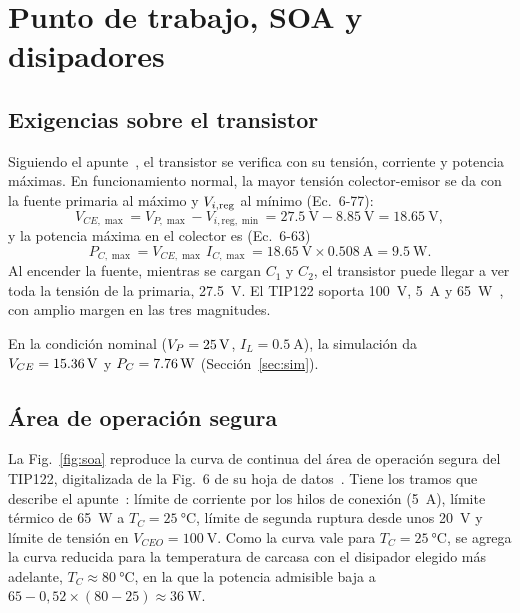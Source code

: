 \section{Punto de trabajo, SOA y disipadores}
\label{sec:soa}

\subsection{Exigencias sobre el transistor}
Siguiendo el apunte~\cite[Sec.~6-8-3]{ap2}, el transistor se verifica con su tensión, corriente y potencia máximas. En funcionamiento normal, la mayor tensión colector-emisor se da con la fuente primaria al máximo y $V_{i,\mathrm{reg}}$ al mínimo (Ec.~6-77):
\begin{equation}
    V_{CE,\max} = V_{P,\max} - V_{i,\mathrm{reg},\min} = \SI{27,5}{\volt} - \SI{8,85}{\volt} = \SI{18,65}{\volt},
\end{equation}
y la potencia máxima en el colector es (Ec.~6-63)
\begin{equation}
    P_{C,\max} = V_{CE,\max}\, I_{C,\max} = \SI{18,65}{\volt} \times \SI{0,508}{\ampere} = \SI{9,5}{\watt}.
\end{equation}
Al encender la fuente, mientras se cargan $C_1$ y $C_2$, el transistor puede llegar a ver toda la tensión de la primaria, \SI{27,5}{\volt}. El TIP122 soporta \SI{100}{\volt}, \SI{5}{\ampere} y \SI{65}{\watt}~\cite{tip120}, con amplio margen en las tres magnitudes.

En la condición nominal ($V_{P} = \SI{25}{\volt}$, $I_L = \SI{0,5}{\ampere}$), la simulación da $V_{CE} = \valu{2}{\simVceVeinticinco}{\volt}$ y $P_C = \valu{2}{\simPqVeinticinco}{\watt}$ (Sección~\ref{sec:sim}).

\subsection{Área de operación segura}
La Fig.~\ref{fig:soa} reproduce la curva de continua del área de operación segura del TIP122, digitalizada de la Fig.~6 de su hoja de datos~\cite{tip120}. Tiene los tramos que describe el apunte~\cite[Sec.~6-8-3c]{ap2}: límite de corriente por los hilos de conexión (\SI{5}{\ampere}), límite térmico de \SI{65}{\watt} a $T_C = \SI{25}{\celsius}$, límite de segunda ruptura desde unos \SI{20}{\volt} y límite de tensión en $V_{CEO} = \SI{100}{\volt}$. Como la curva vale para $T_C = \SI{25}{\celsius}$, se agrega la curva reducida para la temperatura de carcasa con el disipador elegido más adelante, $T_C \approx \SI{80}{\celsius}$, en la que la potencia admisible baja a $65 - 0{,}52\times(80 - 25) \approx \SI{36}{\watt}$.

